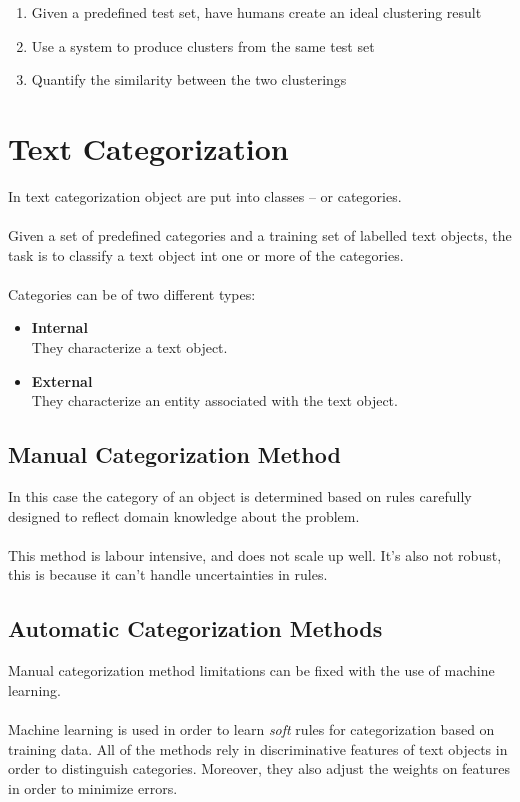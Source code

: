 \documentclass{article}
\begin{document}
\begin{enumerate}
	\item Given a predefined test set, have humans create an ideal clustering result
	\item Use a system to produce clusters from the same test set
	\item Quantify the similarity between the two clusterings
\end{enumerate}

\section{Text Categorization}
In text categorization object are put into classes -- or categories. \\ \\
Given a set of predefined categories and a training set of labelled text objects, the task is to classify a text object int one or more of the categories. \\ \\
Categories can be of two different types:

\begin{itemize}
	\item \textbf{Internal}
	\vspace{.2cm} \\
	They characterize a text object.
	
	\item \textbf{External}
	\vspace{.2cm} \\
	They characterize an entity associated with the text object.
\end{itemize}

\subsection{Manual Categorization Method}
In this case the category of an object is determined based on rules carefully designed to reflect domain knowledge about the problem. \\ \\
This method is labour intensive, and does not scale up well. It's also not robust, this is because it can't handle uncertainties in rules.

\subsection{Automatic Categorization Methods}
Manual categorization method limitations can be fixed with the use of machine learning. \\ \\
Machine learning is used in order to learn \textit{soft} rules for categorization based on training data. All of the methods rely in discriminative features of text objects in order to distinguish categories. Moreover, they also adjust the weights on features in order to minimize errors.
\end{document}
